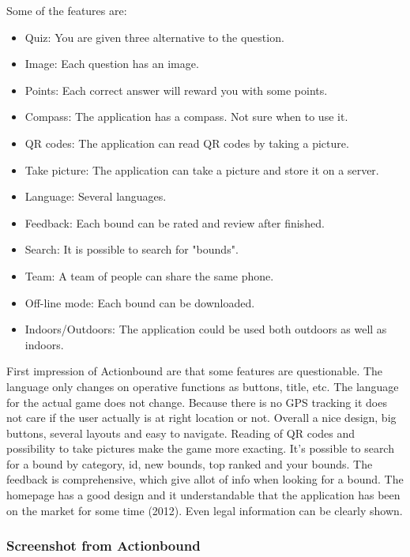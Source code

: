 \documentclass{TDP003mall}
\begin{document}
 Some of the features are:
 \begin{itemize}
  	\item Quiz: You are given three alternative to the question.
		\item Image: Each question has an image.
		\item Points: Each correct answer will reward you with some points.
		\item Compass: The application has a compass. Not sure when to use it.
		\item QR codes: The application can read QR codes by taking a picture.
		\item Take picture: The application can take a picture and store it on a server.
		\item Language: Several languages.
		\item Feedback: Each bound can be rated and review after finished.
		\item Search: It is possible to search for "bounds".
		\item Team: A team of people can share the same phone.
		\item Off-line mode: Each bound can be downloaded.
		\item Indoors/Outdoors: The application could be used both outdoors as well as indoors.
\end{itemize}

First impression of Actionbound are that some features are questionable. The language
only changes on operative functions as buttons, title, etc. The language for the actual game
does not change. Because there is no GPS tracking it does not care if the user actually
is at right location or not. Overall a nice design, big buttons, several layouts and easy
to navigate.
Reading of QR codes and possibility to take pictures make the game more exacting.
It's possible to search for a bound by category, id, new bounds, top ranked and your bounds.
The feedback is comprehensive, which give allot of info when looking for a bound.
The homepage has a good design and it understandable that the application has been on
the market for some time (2012). Even legal information can be clearly shown.

\subsubsection{Screenshot from Actionbound}
\end{document}
